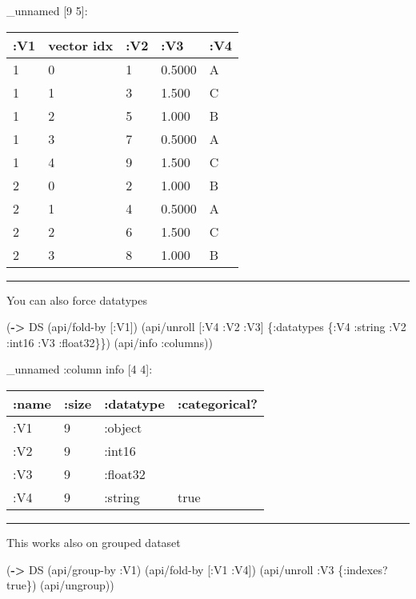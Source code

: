 \documentclass[]{article}
\newenvironment{Shaded}{\begin{snugshade}}{\end{snugshade}}
\newcommand{\KeywordTok}[1]{\textcolor[rgb]{0.13,0.29,0.53}{\textbf{#1}}}
\newcommand{\VariableTok}[1]{\textcolor[rgb]{0.00,0.00,0.00}{#1}}
\newcommand{\AttributeTok}[1]{\textcolor[rgb]{0.77,0.63,0.00}{#1}}
\newcommand{\NormalTok}[1]{#1}
\begin{document}
\_unnamed {[}9 5{]}:

\begin{longtable}[]{@{}lllll@{}}
\toprule
:V1 & vector idx & :V2 & :V3 & :V4\tabularnewline
\midrule
\endhead
1 & 0 & 1 & 0.5000 & A\tabularnewline
1 & 1 & 3 & 1.500 & C\tabularnewline
1 & 2 & 5 & 1.000 & B\tabularnewline
1 & 3 & 7 & 0.5000 & A\tabularnewline
1 & 4 & 9 & 1.500 & C\tabularnewline
2 & 0 & 2 & 1.000 & B\tabularnewline
2 & 1 & 4 & 0.5000 & A\tabularnewline
2 & 2 & 6 & 1.500 & C\tabularnewline
2 & 3 & 8 & 1.000 & B\tabularnewline
\bottomrule
\end{longtable}

\begin{center}\rule{0.5\linewidth}{0.5pt}\end{center}

You can also force datatypes

\begin{Shaded}
\begin{Highlighting}[]
\NormalTok{(}\KeywordTok{->}\NormalTok{ DS}
\NormalTok{    (api/fold-by [}\AttributeTok{:V1}\NormalTok{])}
\NormalTok{    (api/unroll [}\AttributeTok{:V4} \AttributeTok{:V2} \AttributeTok{:V3}\NormalTok{] \{}\AttributeTok{:datatypes}\NormalTok{ \{}\AttributeTok{:V4} \AttributeTok{:string}
                                           \AttributeTok{:V2} \AttributeTok{:int16}
                                           \AttributeTok{:V3} \AttributeTok{:float32}\NormalTok{\}\})}
\NormalTok{    (api/info }\AttributeTok{:columns}\NormalTok{))}
\end{Highlighting}
\end{Shaded}

\_unnamed :column info {[}4 4{]}:

\begin{longtable}[]{@{}llll@{}}
\toprule
:name & :size & :datatype & :categorical?\tabularnewline
\midrule
\endhead
:V1 & 9 & :object &\tabularnewline
:V2 & 9 & :int16 &\tabularnewline
:V3 & 9 & :float32 &\tabularnewline
:V4 & 9 & :string & true\tabularnewline
\bottomrule
\end{longtable}

\begin{center}\rule{0.5\linewidth}{0.5pt}\end{center}

This works also on grouped dataset

\begin{Shaded}
\begin{Highlighting}[]
\NormalTok{(}\KeywordTok{->}\NormalTok{ DS}
\NormalTok{    (api/group-by }\AttributeTok{:V1}\NormalTok{)}
\NormalTok{    (api/fold-by [}\AttributeTok{:V1} \AttributeTok{:V4}\NormalTok{])}
\NormalTok{    (api/unroll }\AttributeTok{:V3}\NormalTok{ \{}\AttributeTok{:indexes}\NormalTok{? }\VariableTok{true}\NormalTok{\})}
\NormalTok{    (api/ungroup))}
\end{Highlighting}
\end{Shaded}
\end{document}
